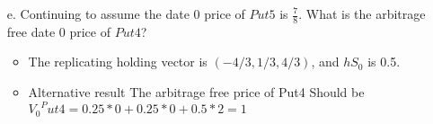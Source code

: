\documentclass[12pt]{article}
\begin{document}
\begin{enumerate}
\begin{itemize}
\begin{comment}
  The above equation plus the characterization of martingale measures for the normalized market $(1, S^2/S^1)$ from part (a) implies $\frac{7}{4} = 1 \cdot (1 - 3q_1) + 3 \cdot (2 q_1)$, which yields $q_1 = \frac{1}{4}$ and a probability $(\frac{1}{4}, \frac{1}{4}, \frac{1}{2})$. Thus, $(S^1, S^2, Put5)$ is arbitrage free because $(\frac{1}{4}, \frac{1}{4}, \frac{1}{2})$ is the unique martingale measure of the corresponding normalized market $(1, S^2/S^1, Put5/S^1)$ with $S^1$ as numeraire.
\end{comment}
  
  
  \item[e.] Continuing to assume the date 0 price of $Put5$ is $\frac{7}{8}$. What is the arbitrage free date 0 price of $Put4$?
  \begin{itemize}
      \item The replicating holding vector is $(-4/3,1/3,4/3)$, and $hS_0$ is 0.5.
      \item Alternative result
      The arbitrage free price of Put4 Should be\\ ${V_0}^Put4 = 0.25*0+0.25*0+0.5*2 = 1$
  \end{itemize}
 

\end{itemize}
\end{enumerate}
\end{document}
